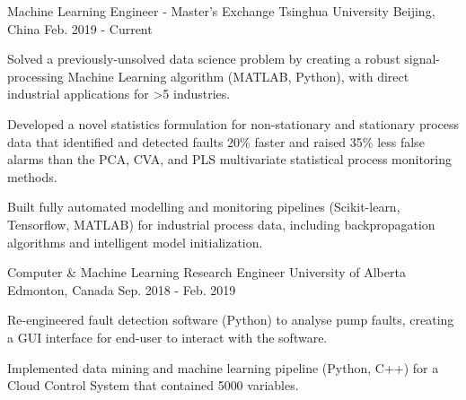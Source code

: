 

\begin{cventries}

  \cventry
    {Machine Learning Engineer - Master's Exchange} %
    {Tsinghua University} %
    {Beijing, China} %
    {Feb. 2019 - Current} %
    {
      \begin{cvitems} %
        \item {Solved a previously-unsolved data science problem by creating a robust signal-processing Machine Learning algorithm (MATLAB, Python), with direct industrial applications for >5 industries.}
        \item {Developed a novel statistics formulation for non-stationary and stationary process data that identified and detected faults 20\% faster and raised 35\% less false alarms than the PCA, CVA, and PLS multivariate statistical process monitoring methods.}
        \item {Built fully automated modelling and monitoring pipelines (Scikit-learn, Tensorflow, MATLAB) for industrial process data, including backpropagation algorithms and intelligent model initialization.}
      \end{cvitems}
    }

  \cventry
    {Computer \& Machine Learning Research Engineer} %
    {University of Alberta} %
    {Edmonton, Canada} %
    {Sep. 2018 - Feb. 2019} %
    {
      \begin{cvitems} %
        \item {Re-engineered fault detection software (Python) to analyse pump faults, creating a GUI interface for end-user to interact with the software.}
        \item {Implemented data mining and machine learning pipeline (Python, C++) for a Cloud Control System that contained 5000 variables.}
      \end{cvitems}
    }


\end{cventries}
